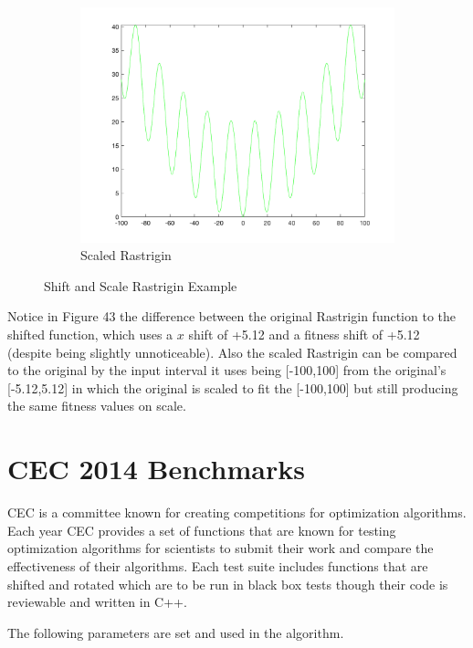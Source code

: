 \begin{figure}
\begin{subfigure}[b]{0.6\textwidth}
    \includegraphics[width=\textwidth]{img/translates/rastrigin/loa-graph-scale}
    \caption{Scaled Rastrigin}
  \end{subfigure}
  \caption{Shift and Scale Rastrigin Example}
\end{figure}

\par Notice in Figure 43 the difference between the original Rastrigin function to the shifted function, which uses a $x$ shift of +5.12 and a fitness shift of +5.12 (despite being slightly unnoticeable). Also the scaled Rastrigin can be compared to the original by the input interval it uses being [-100,100] from the original's [-5.12,5.12] in which the original is scaled to fit the [-100,100] but still producing the same fitness values on scale.

\clearpage

\section{CEC 2014 Benchmarks}

\par CEC is a committee known for creating competitions for optimization algorithms. Each year CEC provides a set of functions that are known for testing optimization algorithms for scientists to submit their work and compare the effectiveness of their algorithms. Each test suite includes functions that are shifted and rotated which are to be run in black box tests though their code is reviewable and written in C++.

\par The following parameters are set and used in the algorithm.

